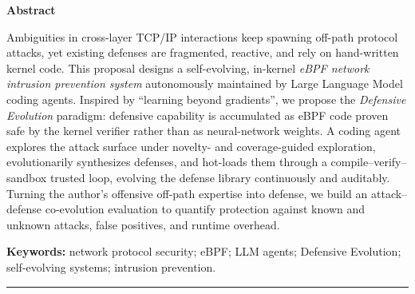 \documentclass[11pt,a4paper]{ctexart}
\begin{document}
\smallskip
\begin{center}\textbf{\large Abstract}\end{center}
\noindent Ambiguities in cross-layer TCP/IP interactions keep spawning off-path protocol attacks, yet existing defenses are fragmented, reactive, and rely on hand-written kernel code. This proposal designs a self-evolving, in-kernel \emph{eBPF network intrusion prevention system} autonomously maintained by Large Language Model coding agents. Inspired by ``learning beyond gradients'', we propose the \emph{Defensive Evolution} paradigm: defensive capability is accumulated as eBPF code proven safe by the kernel verifier rather than as neural-network weights. A coding agent explores the attack surface under novelty- and coverage-guided exploration, evolutionarily synthesizes defenses, and hot-loads them through a compile--verify--sandbox trusted loop, evolving the defense library continuously and auditably. Turning the author's offensive off-path expertise into defense, we build an attack--defense co-evolution evaluation to quantify protection against known and unknown attacks, false positives, and runtime overhead.

\smallskip
\noindent\textbf{Keywords:} network protocol security; eBPF; LLM agents; Defensive Evolution; self-evolving systems; intrusion prevention.

\vspace{6pt}\hrule\vspace{4pt}
{\small\tableofcontents}
\clearpage



\printbibliography[title={参考文献}]
\end{document}
